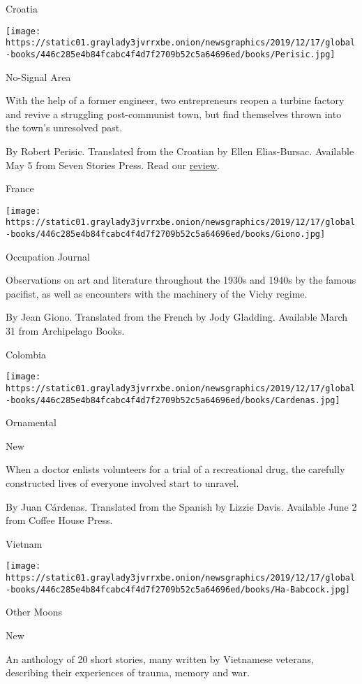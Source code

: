 Croatia

\texttt{[image: https://static01.graylady3jvrrxbe.onion/newsgraphics/2019/12/17/global-books/446c285e4b84fcabc4f4d7f2709b52c5a64696ed/books/Perisic.jpg]}

No-Signal Area

With the help of a former engineer, two entrepreneurs reopen a turbine
factory and revive a struggling post-communist town, but find themselves
thrown into the town's unresolved past.

 By Robert Perisic. Translated from the Croatian by Ellen Elias-Bursac.
Available May 5 from Seven Stories Press. Read our
\href{https://www.nytimes3xbfgragh.onion/2020/04/28/books/review/robert-perisic-no-signal-area.html}{review}.

France

\texttt{[image: https://static01.graylady3jvrrxbe.onion/newsgraphics/2019/12/17/global-books/446c285e4b84fcabc4f4d7f2709b52c5a64696ed/books/Giono.jpg]}

Occupation Journal

Observations on art and literature throughout the 1930s and 1940s by the
famous pacifist, as well as encounters with the machinery of the Vichy
regime.

 By Jean Giono. Translated from the French by Jody Gladding. Available
March 31 from Archipelago Books.

Colombia

\texttt{[image: https://static01.graylady3jvrrxbe.onion/newsgraphics/2019/12/17/global-books/446c285e4b84fcabc4f4d7f2709b52c5a64696ed/books/Cardenas.jpg]}

Ornamental

New

When a doctor enlists volunteers for a trial of a recreational drug, the
carefully constructed lives of everyone involved start to unravel.

 By Juan Cárdenas. Translated from the Spanish by Lizzie Davis.
Available June 2 from Coffee House Press.

Vietnam

\texttt{[image: https://static01.graylady3jvrrxbe.onion/newsgraphics/2019/12/17/global-books/446c285e4b84fcabc4f4d7f2709b52c5a64696ed/books/Ha-Babcock.jpg]}

Other Moons

New

An anthology of 20 short stories, many written by Vietnamese veterans,
describing their experiences of trauma, memory and war.

